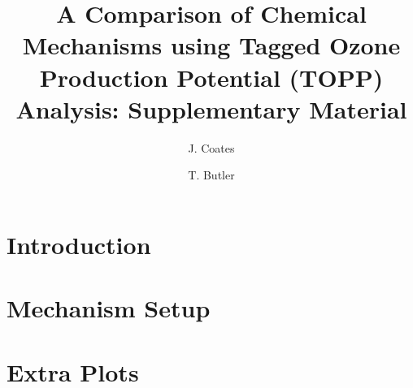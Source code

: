 \documentclass[11pt,a4paper]{article}
\title{A Comparison of Chemical Mechanisms using Tagged Ozone Production Potential (TOPP) Analysis: Supplementary Material}
\author[1]{J. Coates}%
\author[1]{T. Butler}
\affil[1]{Institute for Advanced Sustainability Studies, Potsdam, Germany}
\begin{document}
\maketitle

\section{Introduction} \label{s:introduction}


\section{Mechanism Setup} \label{s:mechanism}



\section{Extra Plots} \label{s:extra_plots}


\newpage


 
\end{document}
